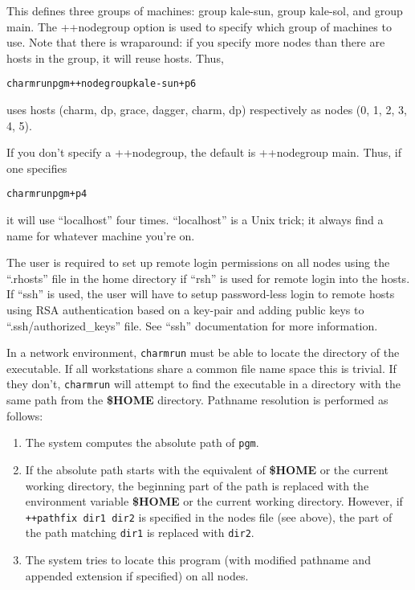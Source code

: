 This defines three groups of machines: group kale-sun, group kale-sol,
and group main.  The ++nodegroup option is used to specify which group
of machines to use.  Note that there is wraparound: if you specify
more nodes than there are hosts in the group, it will reuse
hosts. Thus,

\begin{alltt}
        charmrun pgm ++nodegroup kale-sun +p6
\end{alltt}

uses hosts (charm, dp, grace, dagger, charm, dp) respectively as
nodes (0, 1, 2, 3, 4, 5).

If you don't specify a ++nodegroup, the default is ++nodegroup main.
Thus, if one specifies

\begin{alltt}
        charmrun pgm +p4
\end{alltt}

it will use ``localhost'' four times.  ``localhost'' is a Unix
trick; it always find a name for whatever machine you're on.

The user is required to set up remote login permissions on all nodes
using the ``.rhosts'' file in the home directory if ``rsh'' is used for remote
login into the hosts. If ``ssh'' is used, the user will have to setup
password-less login to remote hosts using
RSA authentication based on a key-pair and adding public keys to 
``.ssh/authorized\_keys'' file. See ``ssh'' documentation for more information.

In a network environment, {\tt charmrun} must
be able to locate the directory of the executable.  If all workstations
share a common file name space this is trivial.  If they don't, {\tt charmrun}
will attempt to find the executable in a directory with the same path
from the {\bf \$HOME} directory.  Pathname resolution is performed as 
follows:
\begin{enumerate}
	\item The system computes the absolute path of {\tt pgm}.
	\item If the absolute path starts with the equivalent of {\bf \$HOME} 
	or the current working directory, the beginning part of the 
        path 
	is replaced with the environment variable {\bf \$HOME} or the 
	current working directory. However, if {\tt ++pathfix dir1 dir2} is 
        specified in the nodes file (see above), the part of
        the path matching {\tt dir1} is replaced with {\tt dir2}.
	\item The system tries to locate this program (with modified 
	pathname and appended extension if specified) on all nodes.
\end{enumerate}

